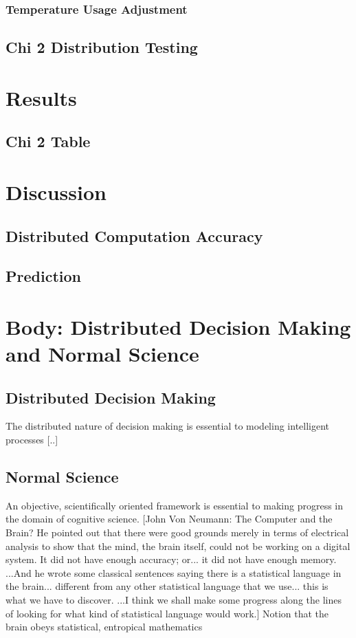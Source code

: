 \documentclass[a4paper]{article}
\begin{document}
        \subsubsection{Temperature Usage Adjustment}
    \subsection{Chi \^ 2 Distribution Testing}
\section{Results}
    \subsection{Chi \^ 2 Table}
\section{Discussion}
    \subsection{Distributed Computation Accuracy}
    \subsection{Prediction}

\section{Body: Distributed Decision Making and Normal Science}

\subsection{Distributed Decision Making}

    The distributed nature of decision making is essential to modeling intelligent processes [..]

\subsection{Normal Science}

    An objective, scientifically oriented framework is essential to making progress in the domain of cognitive science.
    [John Von Neumann: The Computer and the Brain?
    He pointed out that there were good grounds merely in terms of electrical analysis to show that the mind, the brain itself, could not be working on a digital system. It did not have enough accuracy; or... it did not have enough memory. ...And he wrote some classical sentences saying there is a statistical language in the brain... different from any other statistical language that we use... this is what we have to discover. ...I think we shall make some progress along the lines of looking for what kind of statistical language would work.]
    Notion that the brain obeys statistical, entropical mathematics
\end{document}
